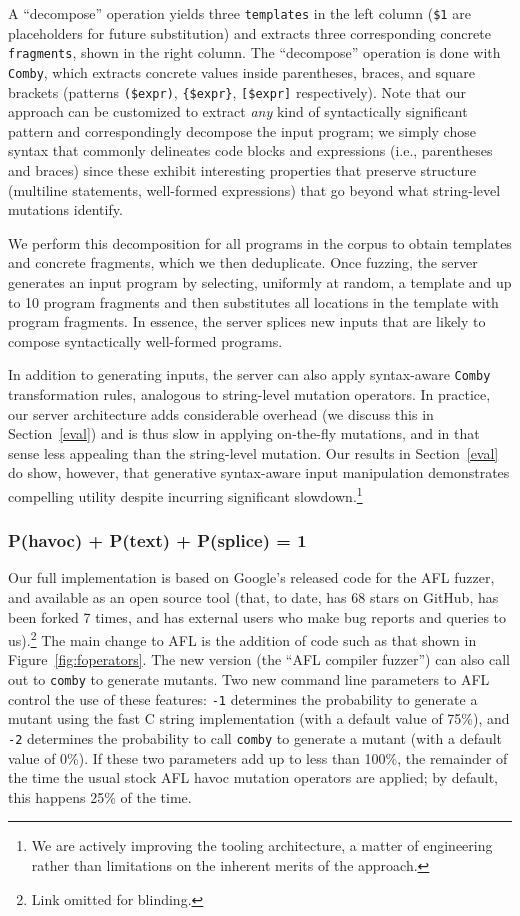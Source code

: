 A ``decompose'' operation yields three \texttt{templates} in the left column
({\tt\color{dkgreen}\$1} are placeholders for future substitution) and extracts
three corresponding concrete \texttt{fragments}, shown in the right column. 
The ``decompose'' operation is done with \texttt{Comby}, which extracts concrete
values inside parentheses, braces, and square brackets (patterns
\texttt{(\$expr)}, \texttt{\{\$expr\}}, \texttt{[\$expr]} respectively). Note
that our approach can be customized to extract \emph{any} kind of syntactically
significant pattern and correspondingly decompose the input program; we simply
chose syntax that commonly delineates code blocks and expressions (i.e.,
parentheses and braces) since these exhibit interesting properties that
preserve structure (multiline statements, well-formed expressions) that go
beyond what string-level mutations identify.

We perform this decomposition for all programs in the corpus to obtain
templates and concrete fragments, which we then deduplicate. Once fuzzing, the
server generates an input program by selecting, uniformly at random, a template
and up to 10 program fragments and then substitutes all locations in the
template with program fragments. In essence, the server splices new inputs that
are likely to compose syntactically well-formed programs.

In addition to generating inputs, the server can also apply syntax-aware
\texttt{Comby} transformation rules, analogous to string-level mutation
operators. In practice, our server architecture adds considerable overhead (we
discuss this in Section~\ref{eval}) and is thus slow in applying
on-the-fly mutations, and in that sense less
appealing than the string-level mutation. Our
results in Section~\ref{eval} do show, however, that generative
syntax-aware input manipulation demonstrates compelling utility despite
incurring significant slowdown.\footnote{We are actively improving the tooling
architecture, a matter of engineering rather than
limitations on the inherent merits of the approach.}

\subsubsection{P(havoc) + P(text) + P(splice) = 1}

Our full implementation is based on Google's released code for the AFL
fuzzer, and available as an open source tool (that, to date, has 68
stars on GitHub, has been forked 7 times, and has external users who
make bug reports and queries to us).\footnote{Link omitted for
  blinding.}  The main change to AFL is the addition of code such as that shown in
Figure~\ref{fig:foperators}.  The new version (the ``AFL compiler
fuzzer'') can also call out to {\tt comby} to generate mutants.  Two
new command line parameters to AFL control the use of these features:
{\tt -1} determines the probability to generate a mutant using the
fast C string implementation (with a default value of 75\%), and {\tt -2} determines the probability
to call {\tt comby} to generate a mutant (with a default value of
0\%).  If these two parameters add up to less than 100\%, the
remainder of the time the usual stock AFL havoc mutation operators are
applied; by default, this happens 25\% of the time.
